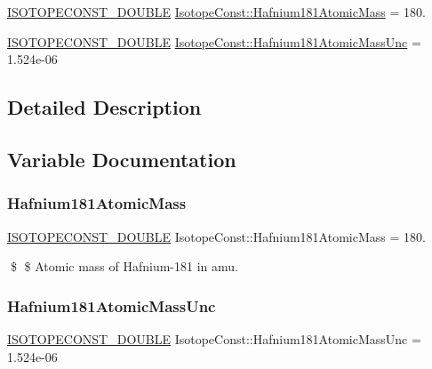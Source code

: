 \begin{DoxyCompactItemize}
\item 
\mbox{\hyperlink{group___isotope_const-_macros_ga8f45a7272ce02c0b4c65c44636ed719a}{I\+S\+O\+T\+O\+P\+E\+C\+O\+N\+S\+T\+\_\+\+D\+O\+U\+B\+LE}} \mbox{\hyperlink{group___isotope_const-_hafnium-_hf181_gafc22686b6259528ee14bac89eebf7b2e}{Isotope\+Const\+::\+Hafnium181\+Atomic\+Mass}} = 180.
\item 
\mbox{\hyperlink{group___isotope_const-_macros_ga8f45a7272ce02c0b4c65c44636ed719a}{I\+S\+O\+T\+O\+P\+E\+C\+O\+N\+S\+T\+\_\+\+D\+O\+U\+B\+LE}} \mbox{\hyperlink{group___isotope_const-_hafnium-_hf181_ga6156f16441585d854add4f79ba2d332b}{Isotope\+Const\+::\+Hafnium181\+Atomic\+Mass\+Unc}} = 1.\+524e-\/06
\end{DoxyCompactItemize}


\subsection{Detailed Description}


\subsection{Variable Documentation}
\mbox{\label{group___isotope_const-_hafnium-_hf181_gafc22686b6259528ee14bac89eebf7b2e}} 
\subsubsection{\texorpdfstring{Hafnium181\+Atomic\+Mass}{Hafnium181AtomicMass}}
{\footnotesize\ttfamily \mbox{\hyperlink{group___isotope_const-_macros_ga8f45a7272ce02c0b4c65c44636ed719a}{I\+S\+O\+T\+O\+P\+E\+C\+O\+N\+S\+T\+\_\+\+D\+O\+U\+B\+LE}} Isotope\+Const\+::\+Hafnium181\+Atomic\+Mass = 180.}

\$ \$ Atomic mass of Hafnium-\/181 in amu. \mbox{\label{group___isotope_const-_hafnium-_hf181_ga6156f16441585d854add4f79ba2d332b}} 
\subsubsection{\texorpdfstring{Hafnium181\+Atomic\+Mass\+Unc}{Hafnium181AtomicMassUnc}}
{\footnotesize\ttfamily \mbox{\hyperlink{group___isotope_const-_macros_ga8f45a7272ce02c0b4c65c44636ed719a}{I\+S\+O\+T\+O\+P\+E\+C\+O\+N\+S\+T\+\_\+\+D\+O\+U\+B\+LE}} Isotope\+Const\+::\+Hafnium181\+Atomic\+Mass\+Unc = 1.\+524e-\/06}

